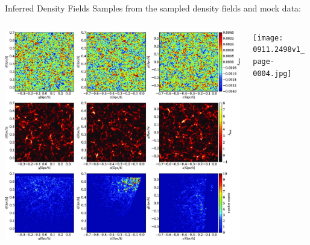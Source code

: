 \documentclass[10pt]{beamer}
\begin{document}
\begin{frame}[fragile]{Inferred Density Fields}
Samples from the sampled density fields and mock data:
\begin{columns}
        \begin{column}{0.7\textwidth} %
            \includegraphics[width=1.1\textwidth]{stt449fig5.jpeg}
        \end{column}\pause
        \begin{column}{0.2\textwidth} %
            \texttt{[image: 0911.2498v1\_page-0004.jpg]}
        \end{column}
\end{columns}
  
\end{frame}
\end{document}

